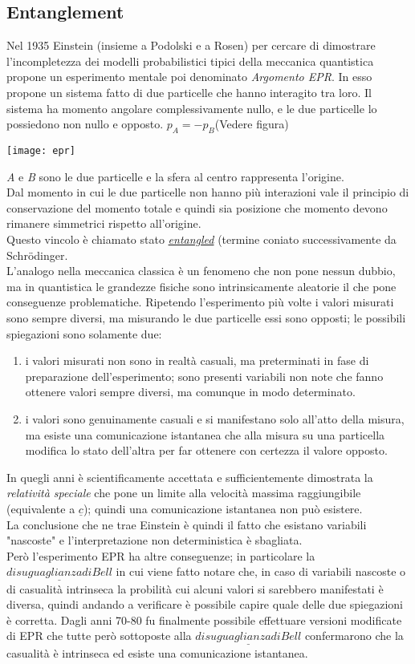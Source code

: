 \subsection{Entanglement}
\label{sec:entanglement}
Nel 1935 Einstein (insieme a Podolski e a Rosen) per cercare di dimostrare l'incompletezza dei modelli probabilistici tipici della meccanica quantistica propone un esperimento mentale poi denominato \textit{Argomento EPR}.
In esso propone un sistema fatto di due particelle che hanno interagito tra loro. Il sistema ha momento angolare complessivamente nullo, e le due particelle lo possiedono non nullo e opposto. $p_A=-p_B$(Vedere figura)
\begin{center}
\texttt{[image: epr]}
\end{center}
\textit{A} e \textit{B} sono le due particelle e la sfera al centro rappresenta l'origine.\\
Dal momento in cui le due particelle non hanno più interazioni vale il principio di conservazione del momento totale e quindi sia posizione che momento devono rimanere simmetrici rispetto all'origine.\\
Questo vincolo è chiamato stato \underline{\textit{entangled}} (termine coniato successivamente da Schr\"{o}dinger.\\
L'analogo nella meccanica classica è un fenomeno che non pone nessun dubbio, ma in quantistica le grandezze fisiche sono intrinsicamente aleatorie il che pone conseguenze problematiche.
Ripetendo l'esperimento più volte i valori misurati sono sempre diversi, ma misurando le due particelle essi sono opposti; le possibili spiegazioni sono solamente due:
\begin{enumerate}
\item i valori misurati non sono in realtà casuali, ma preterminati in fase di preparazione dell'esperimento; sono presenti variabili non note che fanno ottenere valori sempre diversi, ma comunque in modo determinato.
\item i valori sono genuinamente casuali e si manifestano solo all'atto della misura, ma esiste una comunicazione istantanea che alla misura su una particella modifica lo stato dell'altra per far ottenere con certezza il valore opposto.
\end{enumerate}
In quegli anni è scientificamente accettata e sufficientemente dimostrata la \textit{relatività speciale} che pone un limite alla velocità massima raggiungibile (equivalente a $\underline{c}$); quindi una comunicazione istantanea non può esistere.\\
La conclusione che ne trae Einstein è quindi il fatto che esistano variabili "nascoste" e l'interpretazione non deterministica è sbagliata.\\
Però l'esperimento EPR ha altre conseguenze; in particolare la $\underline{disuguaglianza di Bell}$ in cui viene fatto notare che, in caso di variabili nascoste o di casualità intrinseca la probilità cui alcuni valori si sarebbero manifestati è diversa, quindi andando a verificare è possibile capire quale delle due spiegazioni è corretta.
Dagli anni 70-80 fu finalmente possibile effettuare versioni modificate di EPR che tutte però sottoposte alla $\underline{disuguaglianza di Bell}$ confermarono che la casualità è intrinseca ed esiste una comunicazione istantanea.
